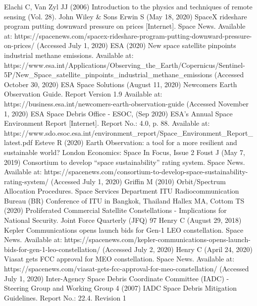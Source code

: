 \documentclass[12pt,a4paper,notitlepage,oneside,openright]{report}
\begin{document}
\begin{thebibliography}{100}
 Elachi C, Van Zyl JJ (2006) Introduction to the physics and techniques of remote sensing (Vol. 28). John Wiley \& Sons
 Erwin S (May 18, 2020) SpaceX rideshare program putting downward pressure on prices [Internet]. Space News. Available at: https://spacenews.com/spacex-rideshare-program-putting-downward-pressure-on-prices/ (Accessed July 1, 2020)
 ESA (2020) New space satellite pinpoints industrial methane emissions. Available at: https://www.esa.int/Applications/Observing_the_Earth/Copernicus/Sentinel-5P/New_Space_satellite_pinpoints_industrial_methane_emissions (Accessed October 30, 2020)
 ESA Space Solutions (August 11, 2020) Newcomers Earth Observation Guide. Report Version 1.9 Available at: https://business.esa.int/newcomers-earth-observation-guide (Accessed November 1, 2020)
 ESA Space Debris Office - ESOC, (Sep 2020) ESA’s Annual Space Environment Report [Internet]. Report No.: 4.0, p. 88. Available at: https://www.sdo.esoc.esa.int/environment_report/Space_Environment_Report_latest.pdf
 Esteve R (2020) Earth Observation: a tool for a more resilient and sustainable world? London Economics: Space In Focus, Issue 2
 Foust J (May 7, 2019) Consortium to develop “space sustainability” rating system. Space News. Available at: https://spacenews.com/consortium-to-develop-space-sustainability-rating-system/ (Accessed July 1, 2020)
 Griffin M (2010) Orbit/Spectrum Allocation Procedures. Space Services Department ITU Radiocommunication Bureau (BR) Conference of ITU in Bangkok, Thailand
 Hallex MA, Cottom TS (2020) Proliferated Commercial Satellite Constellations - Implications for National Security. Joint Force Quarterly (JFQ) 97
 Henry C (August 29, 2018) Kepler Communications opens launch bids for Gen-1 LEO constellation. Space News. Available at: https://spacenews.com/kepler-communications-opens-launch-bids-for-gen-1-leo-constellation/ (Accessed July 2, 2020)
 Henry C (April 24, 2020) Viasat gets FCC approval for MEO constellation. Space News. Available at: https://spacenews.com/viasat-gets-fcc-approval-for-meo-constellation/ (Accessed July 1, 2020)
 Inter-Agency Space Debris Coordinate Committee (IADC) -  Steering Group and Working Group 4 (2007) IADC Space Debris Mitigation Guidelines. Report No.: 22.4. Revision 1

\end{thebibliography}
\end{document}
